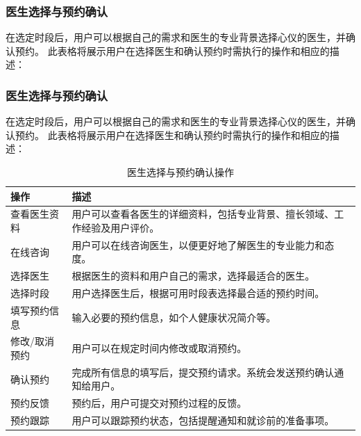 \newpage

\subsubsection{医生选择与预约确认}
在选定时段后，用户可以根据自己的需求和医生的专业背景选择心仪的医生，并确认预约。
此表格将展示用户在选择医生和确认预约时需执行的操作和相应的描述：
\subsubsection{医生选择与预约确认}
在选定时段后，用户可以根据自己的需求和医生的专业背景选择心仪的医生，并确认预约。
此表格将展示用户在选择医生和确认预约时需执行的操作和相应的描述：
\begin{table}[htbp]
	\centering
	\begin{tabular}{|p{6cm}|p{6cm}|}
		\hline
		\textbf{操作} & \textbf{描述} \\
		\hline
		查看医生资料 & 用户可以查看各医生的详细资料，包括专业背景、擅长领域、工作经验及用户评价。 \\
		在线咨询 & 用户可以在线咨询医生，以便更好地了解医生的专业能力和态度。 \\
		选择医生 & 根据医生的资料和用户自己的需求，选择最适合的医生。 \\
		选择时段 & 用户选择医生后，根据可用时段表选择最合适的预约时间。 \\
		填写预约信息 & 输入必要的预约信息，如个人健康状况简介等。 \\
		修改/取消预约 & 用户可以在规定时间内修改或取消预约。 \\
		确认预约 & 完成所有信息的填写后，提交预约请求。系统会发送预约确认通知给用户。 \\
		预约反馈 & 预约后，用户可提交对预约过程的反馈。 \\
		预约跟踪 & 用户可以跟踪预约状态，包括提醒通知和就诊前的准备事项。 \\
		\hline
	\end{tabular}
	\caption{医生选择与预约确认操作}
\end{table}

